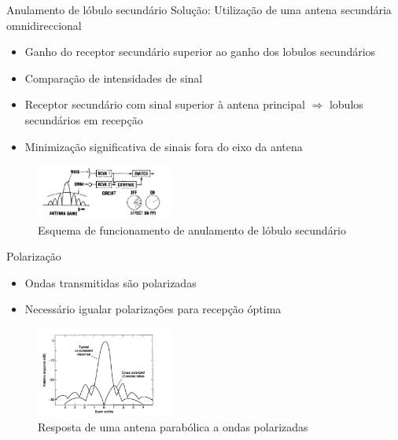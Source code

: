 \documentclass[portuguese,10pt]{beamer}
\begin{document}
\begin{frame}{Anulamento de lóbulo secundário}
Solução: Utilização de uma antena secundária omnidireccional
    \begin{itemize}
    \item<1-> Ganho do receptor secundário superior ao ganho dos lobulos secundários
    \item<2-> Comparação de intensidades de sinal
    \item<3-> Receptor secundário com sinal superior à antena principal $\Rightarrow$ lobulos secundários em recepção
    \item<4-> Minimização significativa de sinais fora do eixo da antena
    \end{itemize}
    \begin{figure}[ht]
\centering
\includegraphics[width=0.4\textwidth]{graphics/sidelobe_suppresion.png}
\caption{Esquema de funcionamento de anulamento de lóbulo secundário}
\label{sidelobe_suppression}
\end{figure}
\end{frame}

\begin{frame}{Polarização}
    \begin{itemize}
    \item<1-> Ondas transmitidas são polarizadas
    \item<2-> Necessário igualar polarizações para recepção óptima
    \end{itemize}
    \begin{figure}[ht]
\centering
\includegraphics[width=0.4\textwidth]{graphics/parabolic_polarization_response.png}
\caption{Resposta de uma antena parabólica a ondas polarizadas}
\label{sidelobe_suppression}
\end{figure}
\end{frame}
\end{document}
